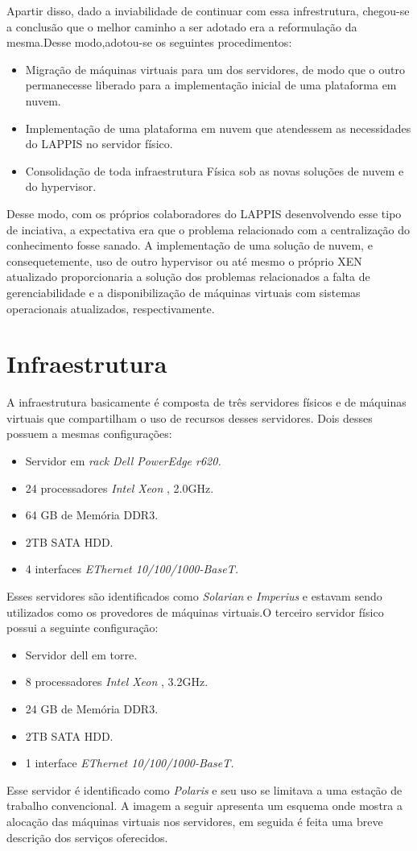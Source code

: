       Apartir disso, dado a inviabilidade de continuar com essa infrestrutura, chegou-se a conclusão que o melhor caminho a ser adotado era a reformulação da mesma.Desse modo,adotou-se os seguintes procedimentos:
\begin{itemize}
      \item Migração de máquinas virtuais para um dos servidores, de modo que o outro permanecesse liberado para a implementação inicial de uma plataforma em nuvem.
      \item	Implementação de uma plataforma em nuvem que atendessem as necessidades do LAPPIS no servidor físico.
      \item Consolidação de toda infraestrutura Física sob as novas soluções de nuvem e do hypervisor.
\end{itemize}      
      
      
Desse modo, com os próprios colaboradores do LAPPIS desenvolvendo esse tipo de inciativa, a expectativa era que o problema relacionado com a centralização do conhecimento fosse sanado. A implementação de uma solução de nuvem, e consequetemente, uso de outro hypervisor ou até mesmo o próprio XEN atualizado proporcionaria a solução dos problemas relacionados a falta de gerenciabilidade e a disponibilização de máquinas virtuais com sistemas operacionais atualizados, respectivamente.        
                
\section{Infraestrutura}
A infraestrutura basicamente é composta de três servidores físicos e de máquinas virtuais que compartilham o uso de recursos desses servidores. Dois desses possuem a mesmas configurações: 
\begin{itemize}
	\item Servidor em \textit{rack} \textit{Dell PowerEdge r620.}
	\item 24 processadores \textit{Intel Xeon }, 2.0GHz.
	\item 64 GB de Memória DDR3.
	\item 2TB SATA HDD.
	\item 4 interfaces \textit{EThernet 10/100/1000-BaseT.}
\end{itemize}
Esses servidores são identificados como \textit{Solarian} e \textit{Imperius} e estavam sendo utilizados como os provedores de máquinas virtuais.O terceiro servidor físico possui a seguinte configuração:
\begin{itemize}
	\item Servidor dell em torre.
	\item 8 processadores \textit{Intel Xeon }, 3.2GHz.
	\item 24 GB de Memória DDR3.
	\item 2TB SATA HDD.
	\item 1 interface \textit{EThernet 10/100/1000-BaseT.}
\end{itemize} 
Esse servidor é identificado como \textit{Polaris} e seu uso se limitava a uma estação de trabalho convencional. A imagem a seguir apresenta um esquema onde mostra a alocação das máquinas virtuais nos servidores, em seguida é feita uma breve descrição dos serviços oferecidos.

